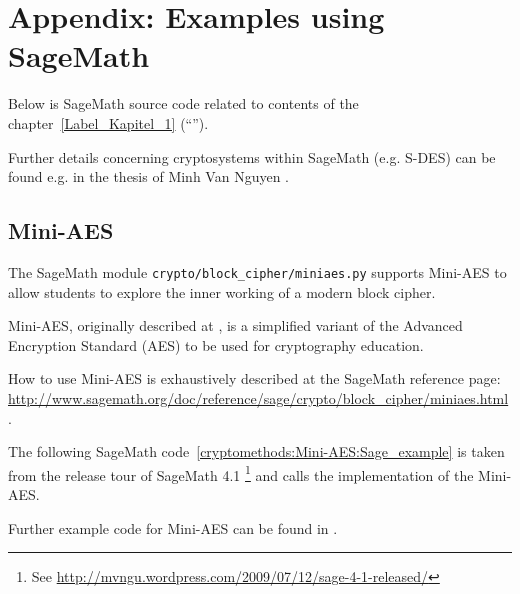 	

\newpage
\hypertarget{CM_Appendix_SageCode}{}
\section{Appendix: Examples using SageMath}
\label{CM_Sage_samples}

\noindent Below is SageMath source code related to contents of the
chapter~\ref{Label_Kapitel_1} (``''). 

Further details concerning cryptosystems within SageMath (e.g. S-DES) can be
found e.g. in the thesis of Minh Van Nguyen \cite{cm:Nguyen2009}.

\subsection{Mini-AES}
\label{CM_Sage_Mini-AES}

The SageMath module \texttt{crypto/block\_cipher/miniaes.py} supports Mini-AES to allow
students to explore the inner working of a modern block cipher.

Mini-AES, originally described at \cite{cm:Phan2002}, is a simplified variant of the
Advanced Encryption Standard (AES) to be used for cryptography education.

How to use Mini-AES is exhaustively described at the SageMath reference page:\\
\url{http://www.sagemath.org/doc/reference/sage/crypto/block_cipher/miniaes.html}.

The following SageMath code~\ref{cryptomethods:Mini-AES:Sage_example}
is taken from the release tour of SageMath 4.1%
\footnote{
See \url{http://mvngu.wordpress.com/2009/07/12/sage-4-1-released/}
}
and calls the implementation of the Mini-AES.

Further example code for Mini-AES can be found in \cite[chap. 6.5 and appendix D]{cm:Nguyen2009}.

